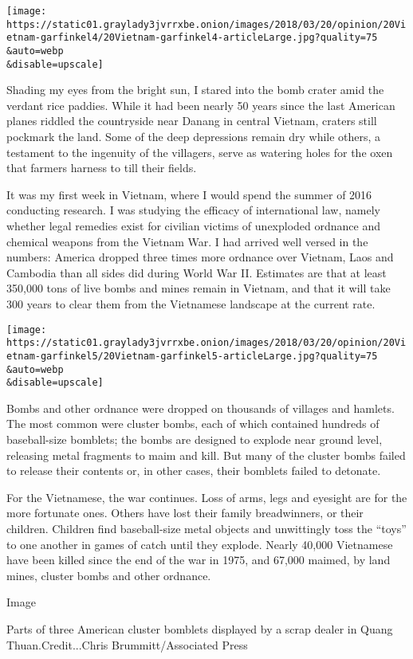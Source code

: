 \texttt{[image: https://static01.graylady3jvrrxbe.onion/images/2018/03/20/opinion/20Vietnam-garfinkel4/20Vietnam-garfinkel4-articleLarge.jpg?quality=75\\\&auto=webp\\\&disable=upscale]}

Shading my eyes from the bright sun, I stared into the bomb crater amid
the verdant rice paddies. While it had been nearly 50 years since the
last American planes riddled the countryside near Danang in central
Vietnam, craters still pockmark the land. Some of the deep depressions
remain dry while others, a testament to the ingenuity of the villagers,
serve as watering holes for the oxen that farmers harness to till their
fields.

It was my first week in Vietnam, where I would spend the summer of 2016
conducting research. I was studying the efficacy of international law,
namely whether legal remedies exist for civilian victims of unexploded
ordnance and chemical weapons from the Vietnam War. I had arrived well
versed in the numbers: America dropped three times more ordnance over
Vietnam, Laos and Cambodia than all sides did during World War II.
Estimates are that at least 350,000 tons of live bombs and mines remain
in Vietnam, and that it will take 300 years to clear them from the
Vietnamese landscape at the current rate.

\texttt{[image: https://static01.graylady3jvrrxbe.onion/images/2018/03/20/opinion/20Vietnam-garfinkel5/20Vietnam-garfinkel5-articleLarge.jpg?quality=75\\\&auto=webp\\\&disable=upscale]}

Bombs and other ordnance were dropped on thousands of villages and
hamlets. The most common were cluster bombs, each of which contained
hundreds of baseball-size bomblets; the bombs are designed to explode
near ground level, releasing metal fragments to maim and kill. But many
of the cluster bombs failed to release their contents or, in other
cases, their bomblets failed to detonate.

For the Vietnamese, the war continues. Loss of arms, legs and eyesight
are for the more fortunate ones. Others have lost their family
breadwinners, or their children. Children find baseball-size metal
objects and unwittingly toss the ``toys'' to one another in games of
catch until they explode. Nearly 40,000 Vietnamese have been killed
since the end of the war in 1975, and 67,000 maimed, by land mines,
cluster bombs and other ordnance.

Image

Parts of three American cluster bomblets displayed by a scrap dealer in
Quang Thuan.Credit...Chris Brummitt/Associated Press

